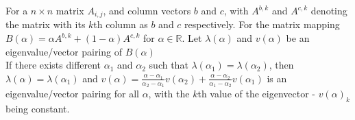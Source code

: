 \begin{Theorem}\label{th:3}
For a $n\times n$ matrix $A_{i,j}$, and column vectors $b$ and $c$, with $A^{b,k}$ and $A^{c,k}$ denoting the matrix with its $k$th column as $b$ and $c$ respectively. For the matrix mapping $B(\alpha) = \alpha A^{b,k} + (1-\alpha)A^{c,k}$ for $\alpha\in\mathbb{R}$. Let $\lambda(\alpha)$ and $v(\alpha)$ be an eigenvalue/vector pairing of $B(\alpha)$\\
If there exists different $\alpha_1$ and $\alpha_2$ such that $\lambda(\alpha_1)=\lambda(\alpha_2)$, then $\lambda(\alpha)=\lambda(\alpha_1)$ and $v(\alpha)=\frac{\alpha-\alpha_1}{\alpha_2-\alpha_1}v(\alpha_2)+\frac{\alpha-\alpha_2}{\alpha_1-\alpha_2}v(\alpha_1)$ is an eigenvalue/vector pairing for all $\alpha$, with the $k$th value of the eigenvector - $v(\alpha)_k$ being constant.
\end{Theorem}
